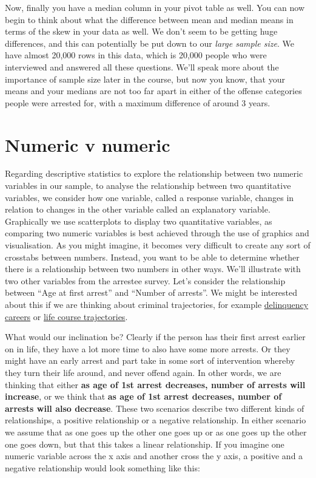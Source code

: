 \documentclass[
]{book}
\begin{document}
Now, finally you have a median column in your pivot table as well. You can now begin to think about what the difference between mean and median means in terms of the skew in your data as well. We don't seem to be getting huge differences, and this can potentially be put down to our \emph{large sample size}. We have almost 20,000 rows in this data, which is 20,000 people who were interviewed and answered all these questions. We'll speak more about the importance of sample size later in the course, but now you know, that your means and your medians are not too far apart in either of the offense categories people were arrested for, with a maximum difference of around 3 years.

\hypertarget{numeric-v-numeric}{%
\section{Numeric v numeric}\label{numeric-v-numeric}}

Regarding descriptive statistics to explore the relationship between two numeric variables in our sample, to analyse the relationship between two quantitative variables, we consider how one variable, called a response variable, changes in relation to changes in the other variable called an explanatory variable. Graphically we use scatterplots to display two quantitative variables, as comparing two numeric variables is best achieved through the use of graphics and visualisation. As you might imagine, it becomes very difficult to create any sort of crosstabs between numbers. Instead, you want to be able to determine whether there is a relationship between two numbers in other ways. We'll illustrate with two other variables from the arrestee survey. Let's consider the relationship between ``Age at first arrest'' and ``Number of arrests''. We might be interested about this if we are thinking about criminal trajectories, for example \href{http://www.journals.uchicago.edu/doi/abs/10.1086/449107}{delinquency careers} or \href{http://onlinelibrary.wiley.com/doi/10.1111/j.1745-9125.1995.tb01173.x/full}{life course trajectories}.

What would our inclination be? Clearly if the person has their first arrest earlier on in life, they have a lot more time to also have some more arrests. Or they might have an early arrest and part take in some sort of intervention whereby they turn their life around, and never offend again. In other words, we are thinking that either \textbf{as age of 1st arrest decreases, number of arrests will increase}, or we think that \textbf{as age of 1st arrest decreases, number of arrests will also decrease}. These two scenarios describe two different kinds of relationships, a positive relationship or a negative relationship. In either scenario we assume that as one goes up the other one goes up or as one goes up the other one goes down, but that this takes a linear relationship. If you imagine one numeric variable across the x axis and another cross the y axis, a positive and a negative relationship would look something like this:
\end{document}

